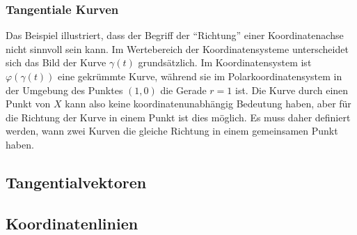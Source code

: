 \subsubsection{Tangentiale Kurven}
Das Beispiel illustriert, dass der Begriff der ``Richtung'' einer
Koordinatenachse nicht sinnvoll sein kann.
Im Wertebereich der Koordinatensysteme unterscheidet sich das Bild
der Kurve $\gamma(t)$ grundsätzlich.
Im Koordinatensystem ist $\varphi(\gamma(t))$ eine gekrümmte Kurve,
während sie im Polarkoordinatensystem in der Umgebung des Punktes
$(1,0)$ die Gerade $r=1$ ist.
Die Kurve durch einen Punkt von $X$ kann also keine koordinatenunabhängig
Bedeutung haben, aber für die Richtung der Kurve in einem Punkt ist
dies möglich.
Es muss daher definiert werden, wann zwei Kurven die gleiche Richtung
in einem gemeinsamen Punkt haben.


%
%
\subsection{Tangentialvektoren}

%
%
\subsection{Koordinatenlinien}



